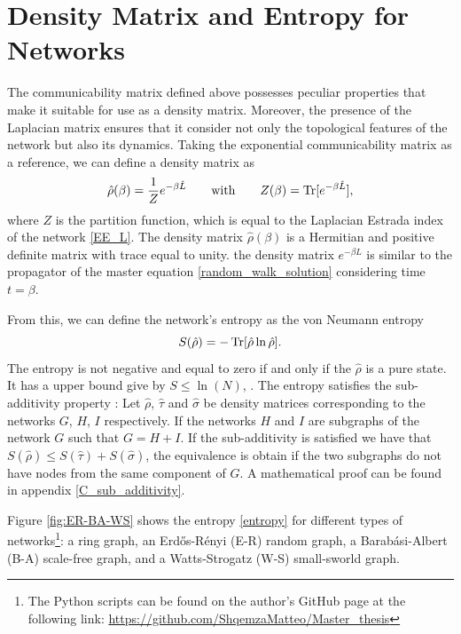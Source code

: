\section{Density Matrix and Entropy for Networks}
The communicability matrix defined above possesses peculiar properties that make it suitable for use as a density matrix. Moreover, the presence of the Laplacian matrix ensures that it consider not only the topological features of the network but also its dynamics. Taking the exponential communicability matrix as a reference, we can define a density matrix as
\begin{equation}\label{density_matrix}
    \hat \rho(\beta) = \frac{1}{Z} e^{-\beta \hat L} \qquad \text{with} \qquad Z(\beta) = \operatorname{Tr}[e^{-\beta \hat L}],
\end{equation}
where $Z$ is the partition function, which is equal to the Laplacian Estrada index of the network \eqref{EE_L}.
The density matrix $\hat \rho(\beta)$ is a Hermitian and positive definite matrix with trace equal to unity. 
the density matrix $e^{-\beta L}$ is similar to the propagator of the master equation \eqref{random_walk_solution} considering time $t = \beta$.

From this, we can define the network's entropy as the von Neumann entropy
\begin{equation} \label{entropy}
    S(\hat\rho) = -\operatorname{Tr}[\hat \rho \ln \hat \rho].
\end{equation}
The entropy is not negative and equal to zero if and only if the $\hat\rho$ is a pure state. It has a upper bound give by $S \leq \ln(N)$,  \cite{Nielsen_Chuang_2010}.
The entropy satisfies the sub-additivity property \cite{De_Domenico_2016}:
Let $\hat\rho$, $\hat\tau$ and $\hat\sigma$ be density matrices corresponding to the networks $G$, $H$, $I$ respectively. If the networks $H$ and $I$ are subgraphs of the network $G$ such that $G = H + I$.
If the sub-additivity is satisfied we have that $S(\hat\rho) \leq S(\hat\tau) + S(\hat\sigma)$, the equivalence is obtain if the two subgraphs do not have nodes from the same component of $G$. A mathematical proof can be found in appendix \ref{C_sub_additivity}.

Figure \ref{fig:ER-BA-WS} shows the entropy \eqref{entropy} for different types of networks\footnote{The Python scripts can be found on the author's GitHub page at the following link: \url{https://github.com/ShqemzaMatteo/Master_thesis}}: a ring graph, an Erd\H{o}s-Rényi (E-R) random graph, a Barab\'asi-Albert (B-A) scale-free graph, and a Watts-Strogatz (W-S) small-sworld graph.

